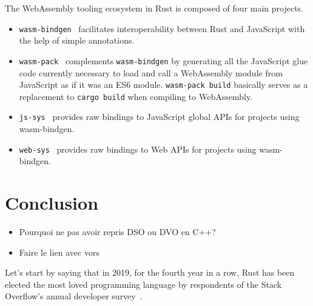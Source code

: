 The WebAssembly tooling ecosystem in Rust is composed of four main projects.
\begin{itemize}
	\item \verb|wasm-bindgen|~\cite{wasmbindgen} facilitates interoperability
		between Rust and JavaScript with the help of simple annotations.
	\item \verb|wasm-pack|~\cite{wasmpack} complements \verb|wasm-bindgen|
		by generating all the JavaScript glue code currently necessary to load and call
		a WebAssembly module from JavaScript as if it was an ES6 module.
		\verb|wasm-pack build| basically serves as a replacement to
		\verb|cargo build| when compiling to WebAssembly.
	\item \verb|js-sys|~\cite{jssys} provides raw bindings to JavaScript global APIs
		for projects using wasm-bindgen.
	\item \verb|web-sys|~\cite{websys} provides raw bindings to Web APIs
		for projects using wasm-bindgen.
\end{itemize}

\section{Conclusion}%
\label{sec:cclwasm}

\begin{itemize}
	\item Pourquoi ne pas avoir repris DSO ou DVO en C++?
	\item Faire le lien avec vors
\end{itemize}

Let's start by saying that in 2019, for the fourth year in a row,
Rust has been elected the most loved programming language
by respondents of the Stack Overflow's annual developer survey~\cite{rustlovedso}.
